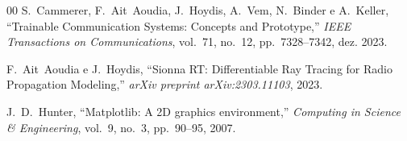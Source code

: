 \documentclass[conference]{IEEEtran}
\begin{document}
\begin{thebibliography}{00}
S.~Cammerer, F.~Ait~Aoudia, J.~Hoydis, A.~Vem, N.~Binder e A.~Keller, ``Trainable Communication Systems: Concepts and Prototype,'' \textit{IEEE Transactions on Communications}, vol.~71, no.~12, pp.~7328--7342, dez. 2023.

F.~Ait~Aoudia e J.~Hoydis, ``Sionna RT: Differentiable Ray Tracing for Radio Propagation Modeling,'' \textit{arXiv preprint arXiv:2303.11103}, 2023.

J.~D.~Hunter, ``Matplotlib: A 2D graphics environment,'' \textit{Computing in Science \& Engineering}, vol.~9, no.~3, pp.~90--95, 2007.

\end{thebibliography}
\end{document}
